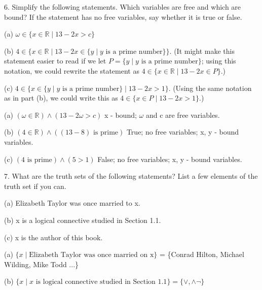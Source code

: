 \documentclass{article}
\begin{document}
6. Simplify the following statements. Which variables are free and which are
bound? If the statement has no free variables, say whether it is true or
false.

\hspace{12pt}(a) $\omega \in \{x \in \mathbb{R} \mid 13 - 2x > c\}$

\hspace{12pt}(b) $4 \in \{x \in \mathbb{R} \mid 13 - 2x \in \{y \mid y \text{ is a prime number}\}\}$. (It might make
this statement easier to read if we let $P = \{y \mid y \text{ is a prime number}\}$;
using this notation, we could rewrite the statement as $4 \in \{x \in \mathbb{R} \mid 13 - 2x \in P\}$.)

\hspace{12pt}(c) $4 \in \{x \in \{y \mid y \text{ is a prime number}\} \mid 13 - 2x > 1\}$. (Using the same notation
as in part (b), we could write this as $4 \in \{x \in P \mid 13 - 2x > 1\}$.)
\vspace{20pt}

(a) $(\omega \in \mathbb{R}) \land (13 - 2\omega > c)$ x - bound; $\omega$ and c are free variables.
\vspace{10pt}

(b) $(4 \in \mathbb{R}) \land ((13 - 8) \text{ is prime})$ True; no free variables; x, y - bound variables.
\vspace{10pt}

(c) $(4 \text{ is prime}) \land (5 > 1)$ False; no free variables; x, y - bound variables.
\vspace{30pt}

7. What are the truth sets of the following statements? List a few elements of
the truth set if you can.

\hspace{12pt}(a) Elizabeth Taylor was once married to x.

\hspace{12pt}(b) x is a logical connective studied in Section 1.1.

\hspace{12pt}(c) x is the author of this book.
\vspace{20pt}

(a) $\{x \mid \text{Elizabeth Taylor was once married on x}\}$ = \{Conrad Hilton, Michael Wilding, Mike Todd ...\}
\vspace{10pt}

(b) $\{x \mid x \text{ is logical connective studied in Section 1.1}\} = \{\lor, \land \neg\}$
\end{document}
